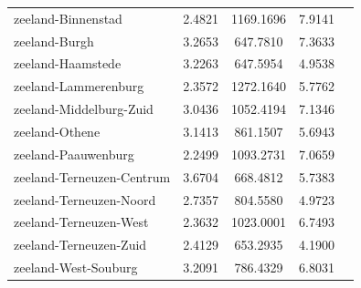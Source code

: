 \begin{longtable}{llccc}
zeeland-Binnenstad & 2.4821 & 1169.1696 & 7.9141 \\
zeeland-Burgh & 3.2653 & 647.7810 & 7.3633 \\
zeeland-Haamstede & 3.2263 & 647.5954 & 4.9538 \\
zeeland-Lammerenburg & 2.3572 & 1272.1640 & 5.7762 \\
zeeland-Middelburg-Zuid & 3.0436 & 1052.4194 & 7.1346 \\
zeeland-Othene & 3.1413 & 861.1507 & 5.6943 \\
zeeland-Paauwenburg & 2.2499 & 1093.2731 & 7.0659 \\
zeeland-Terneuzen-Centrum & 3.6704 & 668.4812 & 5.7383 \\
zeeland-Terneuzen-Noord & 2.7357 & 804.5580 & 4.9723 \\
zeeland-Terneuzen-West & 2.3632 & 1023.0001 & 6.7493 \\
zeeland-Terneuzen-Zuid & 2.4129 & 653.2935 & 4.1900 \\
zeeland-West-Souburg & 3.2091 & 786.4329 & 6.8031 \\
\hline
\end{longtable}
